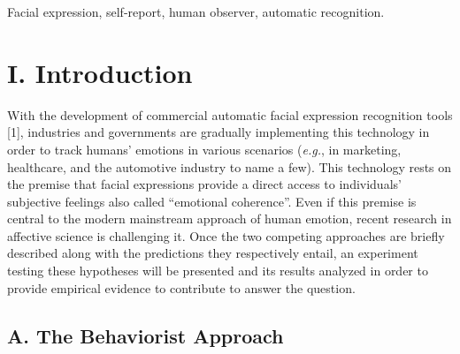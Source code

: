 \documentclass[conference,final,]{IEEEtran}
\begin{document}




\maketitle


%
\IEEEpeerreviewmaketitle


\begin{IEEEkeywords}
Facial expression, self-report, human observer, automatic recognition.
\end{IEEEkeywords}

\hypertarget{i.-introduction}{%
\section{I. Introduction}\label{i.-introduction}}

With the development of commercial automatic facial expression
recognition tools {[}1{]}, industries and governments are gradually
implementing this technology in order to track humans' emotions in
various scenarios (\emph{e.g.}, in marketing, healthcare, and the
automotive industry to name a few). This technology rests on the premise
that facial expressions provide a direct access to individuals'
subjective feelings also called ``emotional coherence''. Even if this
premise is central to the modern mainstream approach of human emotion,
recent research in affective science is challenging it. Once the two
competing approaches are briefly described along with the predictions
they respectively entail, an experiment testing these hypotheses will be
presented and its results analyzed in order to provide empirical
evidence to contribute to answer the question.

\hypertarget{a.-the-behaviorist-approach}{%
\subsection{A. The Behaviorist
Approach}\label{a.-the-behaviorist-approach}}
\end{document}
